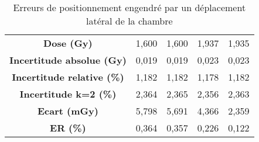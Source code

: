 \documentclass{article}
\begin{document}
\begin{table}[h]
\begin{tabular}{c|cc|cc|}
  \multicolumn{1}{|c|}{\textbf{Dose (Gy)}}                 & 1,600           & 1,600          & 1,937           & 1,935           \\
  \multicolumn{1}{|c|}{\textbf{Incertitude absolue (Gy)}}  & 0,019           & 0,019          & 0,023           & 0,023           \\
  \multicolumn{1}{|c|}{\textbf{Incertitude relative (\%)}} & 1,182           & 1,182          & 1,178           & 1,182           \\
  \multicolumn{1}{|c|}{\textbf{Incertitude k=2 (\%)}}      & 2,364           & 2,365          & 2,356           & 2,363           \\
  \multicolumn{1}{|c|}{\textbf{Ecart (mGy)}}               & 5,798           & 5,691          & 4,366           & 2,359           \\
  \multicolumn{1}{|c|}{\textbf{ER (\%)}}                   & 0,364           & 0,357          & 0,226           & 0,122           \\ \hline
  \end{tabular}
  \caption{Erreurs de positionnement engendré par un déplacement latéral de la chambre}
  \label{table_erreur_lat}
\end{table}
\end{document}
